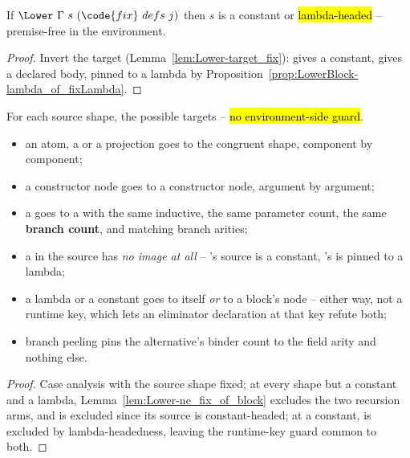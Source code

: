\begin{lemma}
\label{lem:Lower-ne_fix_of_block}
\leanok
{}
 If $\Lower\ \Gamma\ s\ (\code{fix}\ defs\ j)$ then $s$ is a constant or
\hl{lambda-headed} -- premise-free in the environment.
\end{lemma}
\begin{proof}
\leanok
{}
 Invert the target (Lemma~\ref{lem:Lower-target_fix}):  gives a constant,
 gives a declared body, pinned to a lambda by
Proposition~\ref{prop:LowerBlock-lambda_of_fixLambda}.
\end{proof}

\begin{proposition}
\label{prop:Lower-source_const}
\leanok
{}
 For each source shape, the possible targets -- \hl{no environment-side guard}.
\begin{itemize}
\item an atom, a  or a projection goes to the congruent shape, component by component;
\item a constructor node goes to a constructor node, argument by argument;
\item a  goes to a  with the same inductive, the same parameter count, the same
\textbf{branch count}, and matching branch arities;
\item a  in the source has \emph{no image at all} -- 's source is a constant,
's is pinned to a lambda;
\item a lambda or a constant goes to itself \emph{or} to a block's  node -- either way, not a
runtime key, which lets an eliminator declaration at that key refute both;
\item branch peeling pins the alternative's binder count to the field arity and nothing else.
\end{itemize}
\end{proposition}
\begin{proof}
\leanok
{}
 Case analysis with the source shape fixed; at every shape but a constant and a lambda,
Lemma~\ref{lem:Lower-ne_fix_of_block} excludes the two recursion arms, and  is excluded
since its source is constant-headed; at a constant,  is excluded by lambda-headedness,
leaving the runtime-key guard common to both.
\end{proof}

